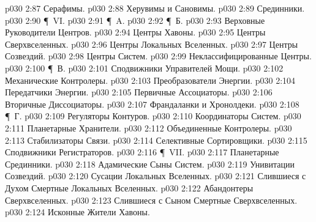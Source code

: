\vs p030 2:87 \bibnobreakspace Серафимы.
\vs p030 2:88 \bibnobreakspace Херувимы и Сановимы.
\vs p030 2:89 \bibnobreakspace Срединники.
\vs p030 2:90 \P\ VI. 
\vs p030 2:91 \P\ A. 
\vs p030 2:92 \P\ Б. 
\vs p030 2:93 \bibnobreakspace Верховные Руководители Центров.
\vs p030 2:94 \bibnobreakspace Центры Хавоны.
\vs p030 2:95 \bibnobreakspace Центры Сверхвселенных.
\vs p030 2:96 \bibnobreakspace Центры Локальных Вселенных.
\vs p030 2:97 \bibnobreakspace Центры Созвездий.
\vs p030 2:98 \bibnobreakspace Центры Систем.
\vs p030 2:99 \bibnobreakspace Неклассифицированные Центры.
\vs p030 2:100 \P\ В. 
\vs p030 2:101 \bibnobreakspace Сподвижники Управителей Мощи.
\vs p030 2:102 \bibnobreakspace Механические Контролеры.
\vs p030 2:103 \bibnobreakspace Преобразователи Энергии.
\vs p030 2:104 \bibnobreakspace Передатчики Энергии.
\vs p030 2:105 \bibnobreakspace Первичные Ассоциаторы.
\vs p030 2:106 \bibnobreakspace Вторичные Диссоциаторы.
\vs p030 2:107 \bibnobreakspace Франдаланки и Хронолдеки.
\vs p030 2:108 \P\ Г. 
\vs p030 2:109 \bibnobreakspace Регуляторы Контуров.
\vs p030 2:110 \bibnobreakspace Координаторы Систем.
\vs p030 2:111 \bibnobreakspace Планетарные Хранители.
\vs p030 2:112 \bibnobreakspace Объединенные Контролеры.
\vs p030 2:113 \bibnobreakspace Стабилизаторы Связи.
\vs p030 2:114 \bibnobreakspace Селективные Сортировщики.
\vs p030 2:115 \bibnobreakspace Сподвижники Регистраторов.
\vs p030 2:116 \P\ VII. 
\vs p030 2:117 \bibnobreakspace Планетарные Срединники.
\vs p030 2:118 \bibnobreakspace Адамические Сыны Систем.
\vs p030 2:119 \bibnobreakspace Унивитации Созвездий.
\vs p030 2:120 \bibnobreakspace Сусации Локальных Вселенных.
\vs p030 2:121 \bibnobreakspace Слившиеся с Духом Смертные Локальных Вселенных.
\vs p030 2:122 \bibnobreakspace Абандонтеры Сверхвселенных.
\vs p030 2:123 \bibnobreakspace Слившиеся с Сыном Смертные Сверхвселенных.
\vs p030 2:124 \bibnobreakspace Исконные Жители Хавоны.
